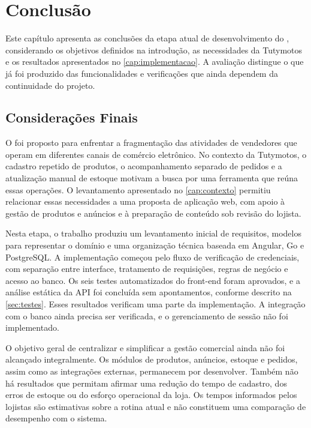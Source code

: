 \chapter{Conclusão}
\label{cap:conclusao}

Este capítulo apresenta as conclusões da etapa atual de desenvolvimento do \sistema{}, considerando os objetivos definidos na introdução, as necessidades da Tutymotos e os resultados apresentados no \autoref{cap:implementacao}. A avaliação distingue o que já foi produzido das funcionalidades e verificações que ainda dependem da continuidade do projeto.

\section{Considerações Finais}

O \sistema{} foi proposto para enfrentar a fragmentação das atividades de vendedores que operam em diferentes canais de comércio eletrônico. No contexto da Tutymotos, o cadastro repetido de produtos, o acompanhamento separado de pedidos e a atualização manual de estoque motivam a busca por uma ferramenta que reúna essas operações. O levantamento apresentado no \autoref{cap:contexto} permitiu relacionar essas necessidades a uma proposta de aplicação web, com apoio à gestão de produtos e anúncios e à preparação de conteúdo sob revisão do lojista.

Nesta etapa, o trabalho produziu um levantamento inicial de requisitos, modelos para representar o domínio e uma organização técnica baseada em Angular, Go e PostgreSQL. A implementação começou pelo fluxo de verificação de credenciais, com separação entre interface, tratamento de requisições, regras de negócio e acesso ao banco. Os seis testes automatizados do front-end foram aprovados, e a análise estática da API foi concluída sem apontamentos, conforme descrito na \autoref{sec:testes}. Esses resultados verificam uma parte da implementação. A integração com o banco ainda precisa ser verificada, e o gerenciamento de sessão não foi implementado.

O objetivo geral de centralizar e simplificar a gestão comercial ainda não foi alcançado integralmente. Os módulos de produtos, anúncios, estoque e pedidos, assim como as integrações externas, permanecem por desenvolver. Também não há resultados que permitam afirmar uma redução do tempo de cadastro, dos erros de estoque ou do esforço operacional da loja. Os tempos informados pelos lojistas são estimativas sobre a rotina atual e não constituem uma comparação de desempenho com o sistema.

